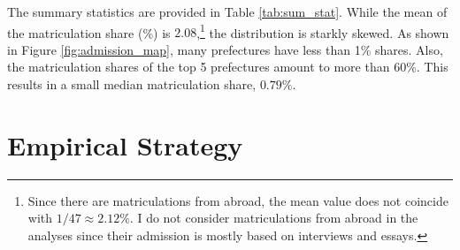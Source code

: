 \documentclass[12pt,letterpaper]{article}
\begin{document}
The summary statistics are provided in Table \ref{tab:sum_stat}.
While the mean of the matriculation share (\%) is $2.08$,\footnote{
  Since there are matriculations from abroad, the mean value does not coincide with $1 / 47 \approx 2.12\%$.
  I do not consider matriculations from abroad in the analyses since their admission is mostly based on interviews and essays.
} the distribution is starkly skewed.
As shown in Figure \ref{fig:admission_map}, many prefectures have less than 1\% shares.
Also, the matriculation shares of the top 5 prefectures amount to more than 60\%.
This results in a small median matriculation share, $0.79 \%$.

%  


\section{Empirical Strategy}\label{sec:empirical_strategy}
\end{document}
